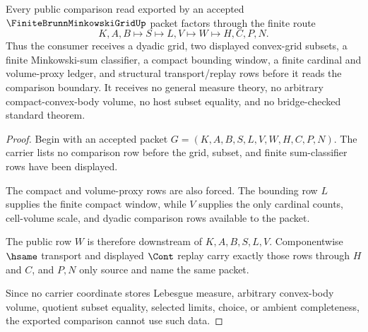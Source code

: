 \begin{theorem}
\label{thm:finite-brunn-minkowski-grid-comparison-route}
Every public comparison read exported by an accepted $\FiniteBrunnMinkowskiGridUp$ packet factors through the finite route
$$
K,A,B \longmapsto S \longmapsto L,V \longmapsto W \longmapsto H,C,P,N .
$$
Thus the consumer receives a dyadic grid, two displayed convex-grid subsets, a finite Minkowski-sum classifier, a compact bounding window, a finite cardinal and volume-proxy ledger, and structural transport/replay rows before it reads the comparison boundary. It receives no general measure theory, no arbitrary compact-convex-body volume, no host subset equality, and no bridge-checked standard theorem.
\end{theorem}
\begin{proof}
Begin with an accepted packet $G=(K,A,B,S,L,V,W,H,C,P,N)$. The carrier lists no comparison row before the grid, subset, and finite sum-classifier rows have been displayed.

The compact and volume-proxy rows are also forced. The bounding row $L$ supplies the finite compact window, while $V$ supplies the only cardinal counts, cell-volume scale, and dyadic comparison rows available to the packet.

The public row $W$ is therefore downstream of $K,A,B,S,L,V$. Componentwise $\hsame$ transport and displayed $\Cont$ replay carry exactly those rows through $H$ and $C$, and $P,N$ only source and name the same packet.

Since no carrier coordinate stores Lebesgue measure, arbitrary convex-body volume, quotient subset equality, selected limits, choice, or ambient completeness, the exported comparison cannot use such data.
\end{proof}



